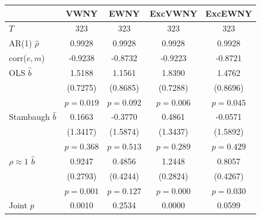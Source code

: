 \begin{tabular}{lcccc}
\toprule
 & VWNY & EWNY & ExcVWNY & ExcEWNY \\
\midrule
$T$ & 323 & 323 & 323 & 323 \\
AR(1) $\hat\rho$ & 0.9928 & 0.9928 & 0.9928 & 0.9928 \\
corr($e,m$) & -0.9238 & -0.8732 & -0.9223 & -0.8721 \\
\midrule
OLS $\hat b$ & 1.5188 & 1.1561 & 1.8390 & 1.4762 \\
 & (0.7275) & (0.8685) & (0.7288) & (0.8696) \\
 & $p=0.019$ & $p=0.092$ & $p=0.006$ & $p=0.045$ \\
Stambaugh $\hat b$ & 0.1663 & -0.3770 & 0.4861 & -0.0571 \\
 & (1.3417) & (1.5874) & (1.3437) & (1.5892) \\
 & $p=0.368$ & $p=0.513$ & $p=0.289$ & $p=0.429$ \\
$\rho\approx1$ $\hat b$ & 0.9247 & 0.4856 & 1.2448 & 0.8057 \\
 & (0.2793) & (0.4244) & (0.2824) & (0.4267) \\
 & $p=0.001$ & $p=0.127$ & $p=0.000$ & $p=0.030$ \\
\midrule
Joint $p$ & 0.0010 & 0.2534 & 0.0000 & 0.0599 \\
\bottomrule
\end{tabular}
